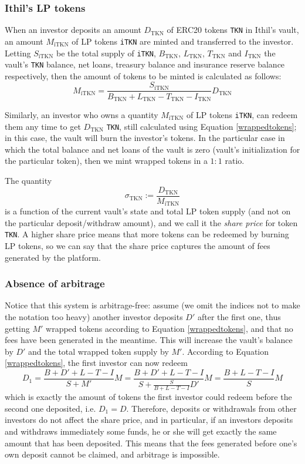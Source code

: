 \documentclass[a4paper,10 pt]{article}
\theoremstyle{definition}
\begin{document}
\subsubsection{Ithil's LP tokens}
When an investor deposits an amount $D_{\text{TKN}}$ of ERC20 tokens \verb|TKN| in Ithil's vault, an amount $M_{\text{iTKN}}$ of LP tokens \verb|iTKN| are minted and transferred to the investor. Letting $S_{\text{iTKN}}$ be the total supply of \verb|iTKN|, $B_{\text{TKN}}$, $L_{\text{TKN}}$, $T_{\text{TKN}}$ and $I_{\text{TKN}}$ the vault's \verb|TKN| balance, net loans, treasury balance and insurance reserve balance respectively, then the amount of tokens to be minted is calculated as follows:
\begin{equation}\label{wrappedtokens}M_{\text{iTKN}} = \frac{S_{\text{iTKN}}}{B_{\text{TKN}} + L_{\text{TKN}} - T_{\text{TKN}} - I_{\text{TKN}}}D_{\text{TKN}}\end{equation}

Similarly, an investor who owns a quantity $M_{\text{iTKN}}$ of LP tokens \verb|iTKN|, can redeem them any time to get $D_{\text{TKN}}$ \verb|TKN|, still calculated using Equation \eqref{wrappedtokens}; in this case, the vault will burn the investor's tokens. In the particular case in which the total balance and net loans of the vault is zero (vault's initialization for the particular token), then we mint wrapped tokens in a $1:1$ ratio.

The quantity $$\sigma_{\text{TKN}} := \frac{D_{\text{TKN}}}{M_{\text{iTKN}}}$$ is a function of the current vault's state and total LP token supply (and not on the particular deposit/withdraw amount), and we call it the {\it share price} for token \verb|TKN|. A higher share price means that more tokens can be redeemed by burning LP tokens, so we can say that the share price captures the amount of fees generated by the platform.

\subsubsection{Absence of arbitrage}
Notice that this system is arbitrage-free: assume (we omit the indices not to make the notation too heavy) another investor deposits $D'$ after the first one, thus getting $M'$ wrapped tokens according to Equation \eqref{wrappedtokens}, and that no fees have been generated in the meantime. This will increase the vault's balance by $D'$ and the total wrapped token supply by $M'$. According to Equation \eqref{wrappedtokens}, the first investor can now redeem
\begin{equation}D_1 = \frac{B+D'+L-T-I}{S+M'}M = \frac{B+D'+L-T-I}{S+\frac{S}{B+L-T-I}D'}M = \frac{B+L-T-I}{S}M \end{equation}
which is exactly the amount of tokens the first investor could redeem before the second one deposited, i.e. $D_1 = D$. Therefore, deposits or withdrawals from other investors do not affect the share price, and in particular, if an investors deposits and withdraws immediately some funds, he or she will get exactly the same amount that has been deposited. This means that the fees generated before one's own deposit cannot be claimed, and arbitrage is impossible.
\end{document}
